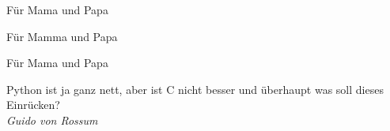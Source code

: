 \thispagestyle{empty}
\null{}\vfill

\begin{center}
  \begin{minipage}{.7\columnwidth}
   Für Mama und Papa
  \end{minipage}
  
  \vspace{3ex}
  
  \hspace{10ex}\begin{minipage}{.7\columnwidth}
   Für Mamma und Papa
  \end{minipage}
  
  \vspace{3ex}
  
  \hspace{4ex}\begin{minipage}{.7\columnwidth}
   Für Mama und Papa
  \end{minipage}
\end{center}
\vfill

\newpage

\thispagestyle{empty}
\null{}\vfill

\begin{center}
  \begin{minipage}{.7\columnwidth}
    Python ist ja ganz nett, aber ist C nicht besser und überhaupt was soll dieses Einrücken?\\[3ex]
    
    \raggedleft
    \emph{Guido von Rossum}
  \end{minipage}
\end{center}
\vfill